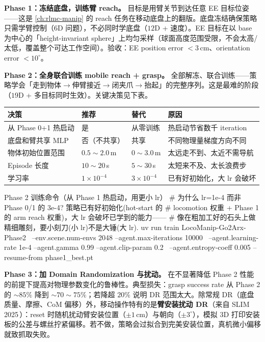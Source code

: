 \textbf{Phase 1：冻结底盘，训练臂 reach。} 目标是用臂关节到达任意 EE 目标位姿——这是 \cref{ch:rlmc-manip} 的 reach 任务在移动底盘上的翻版。底盘冻结确保策略只需学臂控制（$6$D 问题），不必同时学底盘（$12$D + 速度）。EE 目标在以 base 为中心的「height-invariant sphere」上均匀采样（球面高度范围受限，不会太高/太低，覆盖整个可达工作空间）。验收：EE position error $<3\,$cm、orientation error $<10^\circ$。

\textbf{Phase 2：全身联合训练 mobile reach + grasp。} 全部解冻、联合训练——策略学会「走到物体$\to$伸臂接近$\to$闭夹爪$\to$抬起」的完整序列。这是最难的阶段（$19$D + 多目标同时生效）。关键决策见下表。

\begin{center}
\small
\begin{tabular}{@{}llll@{}}
\toprule
决策 & 推荐 & 替代 & 原因 \\
\midrule
从 Phase 0+1 热启动 & 是 & 从零训练 & 热启动节省数千 iteration \\
底盘和臂共享 MLP & 否（不共享） & 共享 & 不同物理量梯度方向不同 \\
物体初始位置范围 & $0.5\!\sim\!2.0\,$m & $0\!\sim\!3.0\,$m & 太远走不到、太近不需导航 \\
Episode 长度 & $10\!\sim\!20\,$s & $5\!\sim\!30\,$s & 太短来不及、太长浪费步 \\
学习率 & $1\times10^{-4}$ & $3\times10^{-4}$ & 已有好初始化，大 lr 会破坏 \\
\bottomrule
\end{tabular}
\end{center}

\begin{codebox}[bash]{Phase 2 训练命令（从 Phase 1 热启动，用更小 lr）}
# 为什么 lr=1e-4 而非 Phase 0/1 的 3e-4? 策略已有好初始化(hot-start 的
# locomotion 权重 + Phase 1 的 arm reach 权重)，大 lr 会破坏已学到的能力——
# 像在粗加工好的石头上做精细雕刻，要小刻刀(小 lr)不是大锤(大 lr).
uv run train LocoManip-Go2Arx-Phase2 \
  --env.scene.num-envs 2048 --agent.max-iterations 10000 \
  --agent.learning-rate 1e-4 --agent.gamma 0.99 --agent.clip-param 0.2 \
  --agent.entropy-coeff 0.005 --resume-from phase1_best.pt
\end{codebox}

\textbf{Phase 3：加 Domain Randomization 与扰动。} 在不显著降低 Phase 2 性能的前提下提高对物理参数变化的鲁棒性。典型损失：grasp success rate 从 Phase 2 的 $\sim\!85\%$ 降到 $\sim\!70\!\sim\!75\%$；若降超 $20\%$ 说明 DR 范围太大。除常规 DR（底盘质量、摩擦、CoM 偏移）外，移动操作特有的是\textbf{臂安装扰动 DR}（来自 SLIM 2025\,\cite{wang2025slim}）：reset 时随机扰动臂安装位置（$\pm1\,$cm）与朝向（$\pm3^\circ$），模拟 3D 打印安装板的公差与螺丝拧紧偏移。若不做，策略会过拟合到完美安装位置，真机微小偏移就致抓取失败。

